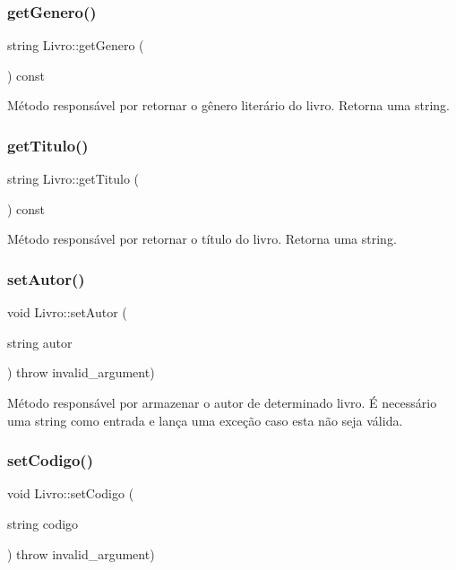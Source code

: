 \subsubsection{\texorpdfstring{get\+Genero()}{getGenero()}}
{\footnotesize\ttfamily string Livro\+::get\+Genero (\begin{DoxyParamCaption}{ }\end{DoxyParamCaption}) const\hspace{0.3cm}{\ttfamily [inline]}}

Método responsável por retornar o gênero literário do livro. Retorna uma string. \mbox{\label{classLivro_a4b4e2e74d4fa1a0e6e9a4d6c05dc3bd4}} 
\subsubsection{\texorpdfstring{get\+Titulo()}{getTitulo()}}
{\footnotesize\ttfamily string Livro\+::get\+Titulo (\begin{DoxyParamCaption}{ }\end{DoxyParamCaption}) const\hspace{0.3cm}{\ttfamily [inline]}}

Método responsável por retornar o título do livro. Retorna uma string. \mbox{\label{classLivro_ab6979584fef48cc9b2ca4dc0359dd69d}} 
\subsubsection{\texorpdfstring{set\+Autor()}{setAutor()}}
{\footnotesize\ttfamily void Livro\+::set\+Autor (\begin{DoxyParamCaption}\item[{string}]{autor }\end{DoxyParamCaption}) throw  invalid\+\_\+argument) \hspace{0.3cm}{\ttfamily [inline]}}

Método responsável por armazenar o autor de determinado livro. É necessário uma string como entrada e lança uma exceção caso esta não seja válida. \mbox{\label{classLivro_a814d21b9fc0e35f974fcd7739082ea58}} 
\subsubsection{\texorpdfstring{set\+Codigo()}{setCodigo()}}
{\footnotesize\ttfamily void Livro\+::set\+Codigo (\begin{DoxyParamCaption}\item[{string}]{codigo }\end{DoxyParamCaption}) throw  invalid\+\_\+argument) \hspace{0.3cm}{\ttfamily [inline]}}


